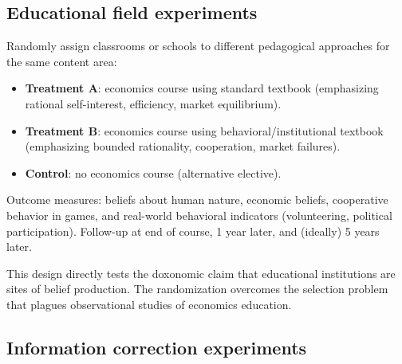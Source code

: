 \subsection{Educational field experiments}

\begin{model}
\label{mod:curriculum}
Randomly assign classrooms or schools to different pedagogical approaches for the same content area:
\begin{itemize}[nosep]
  \item \textbf{Treatment A}: economics course using standard textbook (emphasizing rational self-interest, efficiency, market equilibrium).
  \item \textbf{Treatment B}: economics course using behavioral/institutional textbook (emphasizing bounded rationality, cooperation, market failures).
  \item \textbf{Control}: no economics course (alternative elective).
\end{itemize}
Outcome measures: beliefs about human nature, economic beliefs, cooperative behavior in games, and real-world behavioral indicators (volunteering, political participation).
Follow-up at end of course, 1 year later, and (ideally) 5 years later.
\end{model}

This design directly tests the doxonomic claim that educational institutions are sites of belief production.
The randomization overcomes the selection problem that plagues observational studies of economics education.

\subsection{Information correction experiments}

